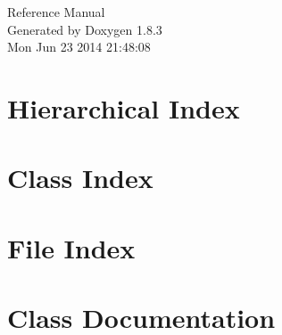 \documentclass{book}
\begin{document}
\hypersetup{pageanchor=false,citecolor=blue}
\begin{titlepage}
\vspace*{7cm}
\begin{center}
{\Large Reference Manual}\\
\vspace*{1cm}
{\large Generated by Doxygen 1.8.3}\\
\vspace*{0.5cm}
{\small Mon Jun 23 2014 21:48:08}\\
\end{center}
\end{titlepage}
\clearemptydoublepage
{}
\tableofcontents
\clearemptydoublepage
{}
\hypersetup{pageanchor=true,citecolor=blue}
\chapter{Hierarchical Index}

\chapter{Class Index}

\chapter{File Index}

\chapter{Class Documentation}





























\end{document}
